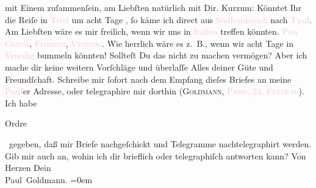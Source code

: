                mit Einem zuſammenſein, am Liebſten natürlich mit Dir.\pend
           \pstart
           Kurzum: Könntet Ihr die Reiſe in \textcolor{pink}{Tirol}{}\ledrightnote{\textcolor{pink}{Tirol}{\newline}\textcolor{pink}{Südtirol}} um
               acht Tage \label{K_L02610-1v}\label{K_L02610-1h}, ſo käme ich direct aus \textcolor{pink}{Südfrankreich}{}\ledrightnote{\textcolor{pink}{Frankreich}} nach \textcolor{pink}{Tirol}{}\ledrightnote{\textcolor{pink}{Tirol}{\newline}\textcolor{pink}{Südtirol}}. Am Liebſten wäre es mir freilich, wenn wir uns in \textcolor{pink}{Italien}{}\ledrightnote{\textcolor{pink}{Italien}} treffen könnten. \textsc{\textcolor{pink}{Pisa}{}\ledrightnote{\textcolor{pink}{Pisa}}}{ }\textsc{\textcolor{pink}{Genua}{}\ledrightnote{\textcolor{pink}{Genua}}}, \textsc{\textcolor{pink}{Florenz}{}\ledrightnote{\textcolor{pink}{Florenz}}}, \textsc{\textcolor{pink}{Venedig}{}\ledrightnote{\textcolor{pink}{Venedig}}}. Wie herrlich wäre es z. B., wenn wir acht Tage in \textcolor{pink}{Venedig}{}\ledrightnote{\textcolor{pink}{Venedig}}{ } bummeln könnten! Sollteſt Du das nicht zu {\pb}machen vermögen? Aber ich mache dir keine weitern Vorſchläge und überlaſſe Alles
               deiner Güte und Freundſchaft.\pend
           \pstart
           Schreibe mir ſofort nach dem Empfang dieſes Briefes an meine \textcolor{pink}{Pariſ}{}\ledrightnote{\textcolor{pink}{Paris}}er Adresse, oder telegraphire mir dorthin (\textsc{Goldmann}, \textsc{\textcolor{pink}{Paris, 24. Feydeau}{}\ledrightnote{\textcolor{pink}{rue Feydeau}}}). Ich habe \begin{otherlanguage}{french}Ordre\end{otherlanguage} gegeben, daß mir Briefe
               nachgeſchickt und Telegramme nachtelegraphirt werden. Gib mir auch an, wohin ich dir
               brieflich oder telegraphiſch antworten kann? Von Herzen\pend
           \pstart
           Dein{\\[\baselineskip]}\spacefill\mbox{Paul Goldmann.}\pend
           \leftskip=0em{}\pstart
           \noindent{}{\pb}\label{T_L02610-1v}\label{T_L02610-1h}\pend
           \endnumbering{}  
      